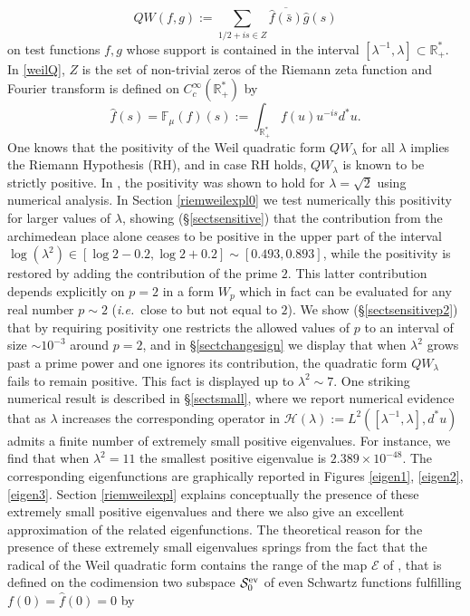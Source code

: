 \documentclass[cupthm]{CUP-JNL-JMJ}
\def\F{{\mathbb F}}
\def\R{{\mathbb R}}
\def\cE{{\mathcal E}}
\def\cS{{\mathcal S}}
\def\cH{{\mathcal H}}
\def\fourier{\F}
\def\sr0{{\cS^{\rm ev}_0}}
\newcommand{\ie}{{\it i.e.\/}\ }
\numberwithin{equation}{section}
\theoremstyle{cupplain}
\theoremstyle{cupdefinition}
\theoremstyle{cupremark}
\theoremstyle{cupproof}
\begin{document}
\begin{equation}\label{weilQ}
QW(f,g):=\sum_{1/2+is\in Z} 	\overline{\widehat f(\bar s)}\widehat g(s)
\end{equation}
on test functions $f,g$ whose support is contained in the interval $[\lambda^{-1},\lambda]\subset \R_+^*$. In \eqref{weilQ},  $Z$ is the set of non-trivial zeros of the Riemann zeta function and Fourier transform is defined on $C_c^{\infty}(\R_+^*)$ by 
\begin{equation}\label{fouriermu}
\widehat f(s)=\fourier_\mu(f)(s):=\int_{\R_+^*}f(u)u^{-is}d^*u.
\end{equation}
 One knows that the positivity of the Weil quadratic form $QW_\lambda$ for all $\lambda$ implies the Riemann Hypothesis (RH), and in case RH holds,  $QW_\lambda$ is known to be strictly positive. In \cite{yoshida}, the positivity was shown to hold for $\lambda=\sqrt 2$ using numerical analysis.    In Section \ref{riemweilexpl0} we test numerically this positivity for larger values of $\lambda$, showing (\S \ref{sectsensitive})  that the contribution from the archimedean place alone  ceases  to be positive  in the upper part of the interval $\log(\lambda^2) \in [\log 2-0.2,\log 2+0.2]\sim [0.493,0.893]$, while  the positivity is  restored by adding the contribution  of the prime $2$. This latter contribution depends explicitly on $p=2$ in a form $W_p$ which in fact can be evaluated for any real number $p\sim 2$ (\ie  close to but not equal to $2$). We show  (\S \ref{sectsensitivep2})  that  by requiring positivity one restricts the allowed  values of $p$ to an interval of size $\sim 10^{-3}$ around $p=2$, and in \S \ref{sectchangesign} we display  that when $\lambda^2$ grows past a prime power and one ignores its contribution, the quadratic form $QW_\lambda$ fails to remain positive. This fact is   displayed   up to $\lambda^2 \sim 7$.   
One striking numerical result  is described in \S \ref{sectsmall}, where we report numerical evidence  that as $\lambda$ increases  the corresponding operator in $\cH(\lambda):=L^2([\lambda^{-1},\lambda],d^*u)$ admits a finite number of extremely small positive eigenvalues. For instance,  we find that when $\lambda^2=11$  the smallest positive eigenvalue is $2.389\times 10^{-48}$. 
 The corresponding eigenfunctions are graphically reported   in Figures \ref{eigen1}, \ref{eigen2}, \ref{eigen3}.
\newline
 Section \ref{riemweilexpl} explains conceptually the presence of these extremely small positive eigenvalues and  there we also give an excellent approximation of the related eigenfunctions. The theoretical  reason for the presence of these extremely small eigenvalues springs from the fact  that the  radical of the Weil quadratic form contains the range of the  map $\cE$ of  \cite{Co-zeta}, that is defined on the codimension two subspace $\sr0$ of even Schwartz functions fulfilling $f(0)=\widehat f(0)=0$ by 
\end{document}
